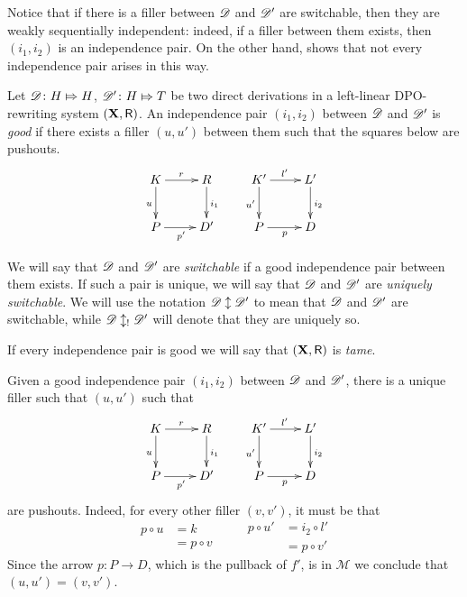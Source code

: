Notice that if there is a filler between  $\mathscr{D}$ and $\mathscr{D}'$ are switchable, then they are weakly sequentially independent: indeed, if a filler between them exists, then $(i_1, i_2)$ is an independence pair. On the other hand,  shows that not every independence pair arises in this way.

\begin{definition}
  \label{de:good-switchable}
  Let $\mathscr{D}\colon H\Mapsto H$, $\mathscr{D}'\colon H\Mapsto T$ be two
  direct derivations in a left-linear DPO-rewriting system $(\textbf {\textup{X}},
  \mathsf{R})$. An independence pair $(i_1, i_2)$ between $\mathscr{D}$ and
  $\mathscr{D}'$ is \emph{good} if there exists a filler $(u,u')$ between
  them such that the squares below are
  pushouts.\[\xymatrix{K \ar[r]^{r} \ar[d]_{u}& R \ar[d]^{i_1} &K'
      \ar[r]^{l'} \ar[d]_{u'}& L'\ar[d]^{i_2} \\P \ar[r]_{p'}& D' & P
      \ar[r]_{p} & D}\]
	
We will say that $\mathscr{D}$ and $\mathscr{D}'$ are \emph{switchable} if a good independence pair between them exists. If such a pair is unique, we will say that $\mathscr{D}$ and $\mathscr{D}'$ are \emph{uniquely switchable}. We will use the notation $\mathscr{D}\updownarrow \mathscr{D'}$ to mean that $\mathscr{D}$ and $\mathscr{D}'$ are switchable, while $\mathscr{D}\updownarrow_! \mathscr{D'}$ will denote that they are uniquely so.


If every independence pair is good we will say that $(\textbf {\textup{X}}, \mathsf{R})$ is \emph{tame}.
\end{definition}

\begin{remark}\label{rem:unic} Given a good independence pair $(i_1, i_2)$ between $\mathscr{D}$ and $\mathscr{D}'$, there is a unique filler  such that $(u,u')$ such that 
	\[\xymatrix{K \ar[r]^{r} \ar[d]_{u}& R \ar[d]^{i_1} &K' \ar[r]^{l'} \ar[d]_{u'}& L'\ar[d]^{i_2} \\P \ar[r]_{p'}& D' & P \ar[r]_{p} & D}\]
	are pushouts. Indeed, for every other filler $(v,v')$, it must be that
	\[\begin{split}
		p\circ u &=k \\&= p\circ v
	\end{split}\qquad \begin{split}
	p\circ u' &= i_2\circ l' \\&= p\circ v'
	\end{split}\]
	Since the arrow $p\colon P\to D$, which is the pullback of $f'$, is in $\mathcal{M}$ we conclude that $(u,u')=(v,v')$.
\end{remark}

